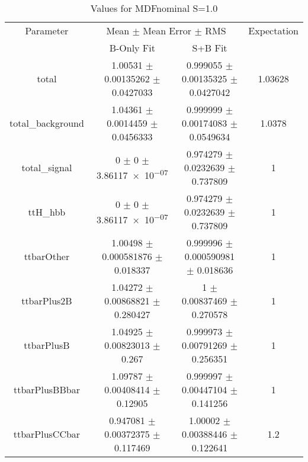 \begin{table}
\centering
\caption{Values for MDFnominal S=1.0}
\begin{tabular}{cccc}
\toprule
Parameter & \multicolumn{2}{c}{Mean $\pm$ Mean Error $\pm$ RMS} & Expectation\\
 & B-Only Fit & S+B Fit & \\
\midrule
total & \num{1.00531} $\pm$ \num{0.00135262} $\pm$ \num{0.0427033} & \num{0.999055} $\pm$ \num{0.00135325} $\pm$ \num{0.0427042} & \num{1.03628}\\
total\_background & \num{1.04361} $\pm$ \num{0.0014459} $\pm$ \num{0.0456333} & \num{0.999999} $\pm$ \num{0.00174083} $\pm$ \num{0.0549634} & \num{1.0378}\\
total\_signal & \num{0} $\pm$ \num{0} $\pm$ \num{3.86117e-07} & \num{0.974279} $\pm$ \num{0.0232639} $\pm$ \num{0.737809} & \num{1}\\
ttH\_hbb & \num{0} $\pm$ \num{0} $\pm$ \num{3.86117e-07} & \num{0.974279} $\pm$ \num{0.0232639} $\pm$ \num{0.737809} & \num{1}\\
ttbarOther & \num{1.00498} $\pm$ \num{0.000581876} $\pm$ \num{0.018337} & \num{0.999996} $\pm$ \num{0.000590981} $\pm$ \num{0.018636} & \num{1}\\
ttbarPlus2B & \num{1.04272} $\pm$ \num{0.00868821} $\pm$ \num{0.280427} & \num{1} $\pm$ \num{0.00837469} $\pm$ \num{0.270578} & \num{1}\\
ttbarPlusB & \num{1.04925} $\pm$ \num{0.00823013} $\pm$ \num{0.267} & \num{0.999973} $\pm$ \num{0.00791269} $\pm$ \num{0.256351} & \num{1}\\
ttbarPlusBBbar & \num{1.09787} $\pm$ \num{0.00408414} $\pm$ \num{0.12905} & \num{0.999997} $\pm$ \num{0.00447104} $\pm$ \num{0.141256} & \num{1}\\
ttbarPlusCCbar & \num{0.947081} $\pm$ \num{0.00372375} $\pm$ \num{0.117469} & \num{1.00002} $\pm$ \num{0.00388446} $\pm$ \num{0.122641} & \num{1.2}\\
\bottomrule
\end{tabular}
\end{table}